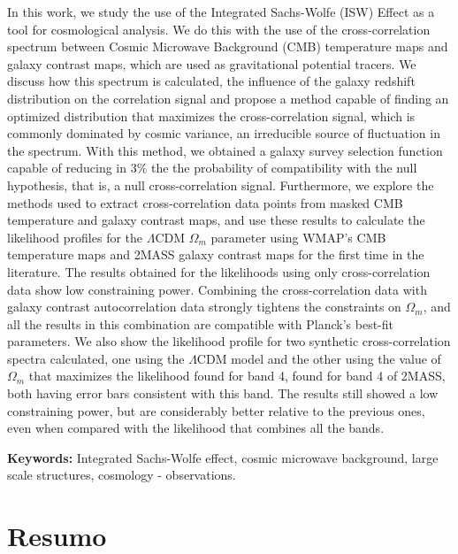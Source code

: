 \documentclass[openany,a4paper,12pt,oneside]{book}
\begin{document}
In this work, we study the use of the Integrated Sachs-Wolfe (ISW) Effect as a tool for cosmological analysis. We do this with the use of the cross-correlation spectrum between Cosmic Microwave Background (CMB) temperature maps and galaxy contrast maps, which are used as gravitational potential tracers. We discuss how this spectrum is calculated, the influence of the galaxy redshift distribution on the correlation signal and propose a method capable of finding an optimized distribution that maximizes the cross-correlation signal, which is commonly dominated by cosmic variance, an irreducible source of fluctuation in the spectrum. With this method, we obtained a galaxy survey selection function capable of reducing in $3\%$ the the probability of compatibility with the null hypothesis, that is, a null cross-correlation signal. Furthermore, we explore the methods used to extract cross-correlation data points from masked CMB temperature and galaxy contrast maps, and use these results to calculate the likelihood profiles for the $\Lambda$CDM $\Omega_m$ parameter using WMAP's CMB temperature maps and 2MASS galaxy contrast maps for the first time in the literature. The results obtained for the likelihoods using only cross-correlation data show low constraining power. Combining the cross-correlation data with galaxy contrast autocorrelation data strongly tightens the constraints on $\Omega_m$, and all the results in this combination are compatible with Planck's best-fit parameters. We also show the likelihood profile for two synthetic cross-correlation spectra calculated, one using the $\Lambda$CDM model and the other using the value of $\Omega_m$ that maximizes the likelihood found for band 4, found for band 4 of 2MASS, both having error bars consistent with this band. The results still showed a low constraining power, but are considerably better relative to the previous ones, even when compared with the likelihood that combines all the bands.

\vspace{1cm}

\noindent \textbf{Keywords:} Integrated Sachs-Wolfe effect, cosmic microwave background, large scale structures, cosmology - observations.

\chapter*{Resumo}
\end{document}
